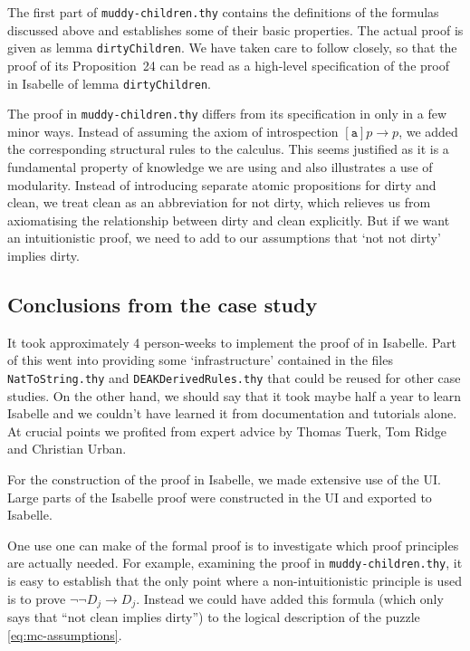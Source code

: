 \documentclass[runningheads,a4paper]{llncs}
\def\aga{\texttt{a}}
\begin{document}
\medskip\noindent The first part of  \texttt{muddy-children.thy} contains the definitions of the formulas discussed above and establishes some of their basic properties. The actual proof is given as lemma \texttt{dirtyChildren}. We have taken care to follow \cite{MaPS14} closely, so that the proof of its Proposition~24 can be read as a high-level specification of the proof in Isabelle of lemma \texttt{dirtyChildren}. 


\medskip\noindent The proof in \texttt{muddy-children.thy} differs from its specification in \cite{MaPS14} only in a few minor ways. Instead of assuming the axiom of introspection $[\aga]p\to p$, we added the corresponding structural rules to the calculus. This seems justified as it is a fundamental property of knowledge we are using and also illustrates a use of modularity. Instead of introducing separate atomic propositions for dirty and clean, we treat clean as an abbreviation for not dirty, which relieves us from axiomatising the relationship between dirty and clean explicitly. But if we want an intuitionistic proof, we need to add to our assumptions that `not not dirty' implies dirty.


\subsection{Conclusions from the case study}
It took approximately 4 person-weeks to implement the proof of \cite[Prop.24]{MaPS14} in Isabelle. Part of this went into providing some `infrastructure' contained in the files \texttt{NatToString.thy} and \texttt{DEAKDerivedRules.thy} that could be reused for other case studies. On the other hand, we should say that it took maybe half a year to learn Isabelle and we couldn't have learned it from documentation and tutorials alone. At crucial points we profited from expert advice by Thomas Tuerk, Tom Ridge and Christian Urban.

For the construction of the proof in Isabelle, we made extensive use of the UI. Large parts of the Isabelle proof were constructed in the UI and exported to Isabelle.

One use one can make of the formal proof is to investigate which proof principles are actually needed. For example, examining the proof in \texttt{muddy-children.thy}, it is easy to establish that the only point where a non-intuitionistic principle is used is to prove $\neg\neg D_j\to D_j$. Instead we could have added this formula (which only says that ``not clean implies dirty'') to the logical description of the puzzle \eqref{eq:mc-assumptions}.
\end{document}
